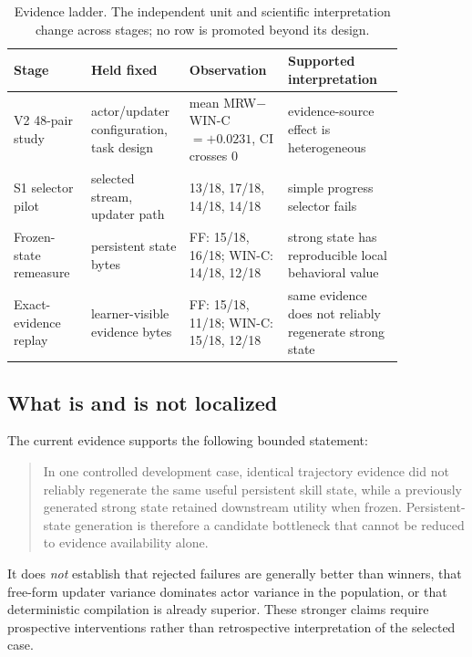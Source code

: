 \begin{table}[t]
\centering
\caption{Evidence ladder. The independent unit and scientific interpretation change across stages; no row is promoted beyond its design.}
\label{tab:evidence-ladder}
\small
\setlength{\tabcolsep}{3pt}
\begin{tabular}{p{0.18\linewidth}p{0.18\linewidth}p{0.22\linewidth}p{0.27\linewidth}}
\toprule
Stage & Held fixed & Observation & Supported interpretation \\
\midrule
V2 48-pair study & actor/updater configuration, task design & mean MRW$-$WIN-C $=+0.0231$, CI crosses 0 & evidence-source effect is heterogeneous \\
S1 selector pilot & selected stream, updater path & 13/18, 17/18, 14/18, 14/18 & simple progress selector fails \\
Frozen-state remeasure & persistent state bytes & FF: 15/18, 16/18; WIN-C: 14/18, 12/18 & strong state has reproducible local behavioral value \\
Exact-evidence replay & learner-visible evidence bytes & FF: 15/18, 11/18; WIN-C: 15/18, 12/18 & same evidence does not reliably regenerate strong state \\
\bottomrule
\end{tabular}
\end{table}

\subsection{What is and is not localized}
The current evidence supports the following bounded statement:

\begin{quote}
In one controlled development case, identical trajectory evidence did not reliably regenerate the same useful persistent skill state, while a previously generated strong state retained downstream utility when frozen. Persistent-state generation is therefore a candidate bottleneck that cannot be reduced to evidence availability alone.
\end{quote}

It does \emph{not} establish that rejected failures are generally better than winners, that free-form updater variance dominates actor variance in the population, or that deterministic compilation is already superior. These stronger claims require prospective interventions rather than retrospective interpretation of the selected case.
